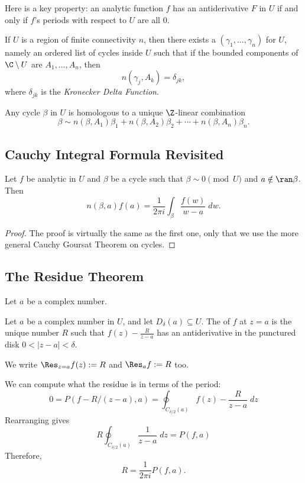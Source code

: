 Here is a key property: an analytic function $f$ has an antiderivative $F$
in $U$ if and only if $f$'s periods with respect to $U$ are all $0$.

\begin{theorem}
    If $U$ is a region of finite connectivity $n$, then there exists
    a  $(\gamma_1, \ldots, \gamma_n)$ for $U$,
    namely an ordered list of cycles inside $U$ such that if the
    bounded components of $\C \setminus U$ are $A_1, \ldots, A_n$,
    then
    \[ n(\gamma_j, A_k) = \delta_{jk}, \]
    where $\delta_{jk}$ is the \textit{Kronecker Delta Function}.
\end{theorem}

\begin{theorem}
    Any cycle $\beta$ in $U$ is homologous to a unique $\Z$-linear
    combination
    \[ \beta \sim n(\beta, A_1)\beta_1 + n(\beta, A_2)\beta_2 + \cdots
    + n(\beta, A_n)\beta_n. \]
\end{theorem}

\subsection{Cauchy Integral Formula Revisited}
\begin{theorem}
    Let $f$ be analytic in $U$ and $\beta$ be a cycle such that $\beta
    \sim 0 \pmod{U}$ and $a \notin \ran \beta$.
    Then
    \[ n(\beta, a)f(a) = \frac{1}{2\pi i} \int_{\beta} \frac{f(w)}{w-a}
    \; dw. \]
\end{theorem}

\begin{proof}
    The proof is virtually the same as the first one, only that we use
    the more general Cauchy Goursat Theorem on cycles.
\end{proof}

\subsection{The Residue Theorem}
Let $a$ be a complex number.
\begin{definition}
    Let $a$ be a complex number in $U$, and let $D_{\delta}(a) \subseteq U$.
    The  of $f$ at $z=a$ is the unique number $R$ such that
    $f(z) - \frac{R}{z-a}$ has an antiderivative in the punctured disk
    $0 < |z-a| < \delta$.

    We write $\Res_{z=a} f(z) := R$ and $\Res_a f := R$ too.
\end{definition}
We can compute what the residue is in terms of the period:
\[ 0 = P(f - R/(z-a), a) = \oint_{C_{\delta/2}(a)} f(z) - \frac{R}{z-a} \; dz \]
Rearranging gives
\[ R \oint_{C_{\delta/2}(a)} \frac{1}{z-a} \; dz = P(f, a) \]
Therefore,
\[ R = \frac{1}{2\pi i} P(f, a). \]

